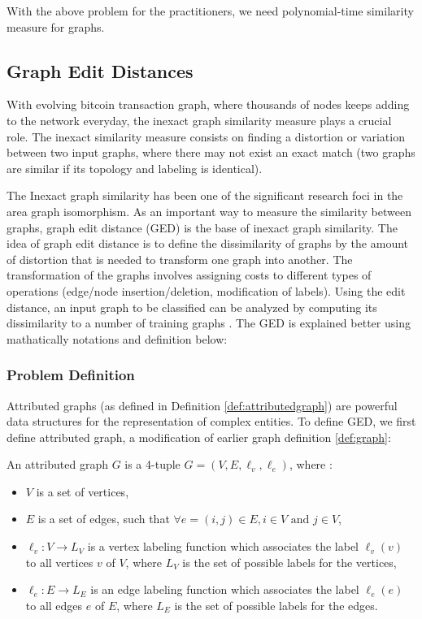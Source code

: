 With the above problem for the practitioners, we need polynomial-time similarity measure for graphs.
\subsection{Graph Edit Distances}

With evolving bitcoin transaction graph, where thousands of nodes keeps adding to the network everyday, the inexact graph similarity measure plays a crucial role. The inexact similarity measure consists on finding a distortion or variation between two input graphs, where there may not exist an exact match (two graphs are similar if its topology 
and labeling is identical).

The Inexact graph similarity has been one of the significant research foci in the area graph isomorphism. As an important way to measure the similarity between graphs, graph edit distance (GED) is the base of inexact graph similarity. The idea of graph edit distance is to define the dissimilarity of graphs by the amount of distortion that is needed to transform one graph into another. The transformation of the graphs involves assigning costs to different types of operations (edge/node insertion/deletion, modification of labels). Using the edit distance, an input graph to be classified can be analyzed by computing its dissimilarity to a number of training graphs \citep{Gao2010}. The GED is explained better using mathatically notations and definition below:

\subsubsection{Problem Definition}
Attributed graphs (as defined in Definition \ref{def:attributedgraph}) are powerful data structures for the representation of complex entities. To define GED, we first define attributed graph, a modification of earlier graph definition \ref{def:graph}: 

\begin{definition}

An attributed graph $G$ is a 4-tuple $G = (V,E,\ell_{v}, \ell_{e} )$, where :
\begin{itemize}
 \item $V$ is a set of vertices,
 \item $E$ is a set of edges, such that $\forall e=(i,j)  \in E, i \in V \textrm{ and } j \in V$,
 \item $\ell_{v} : V \rightarrow L_V$ is a vertex labeling function which associates the label $\ell_{v}(v)$ to all vertices $v$ of $V$,
  where $L_V$ is the set of possible labels for the vertices,
 \item $\ell_{e} : E \rightarrow L_E$ is an edge labeling function which associates the label $\ell_{e}(e)$ to all edges $e$ of $E$,
  where $L_E$ is the set of possible labels for the edges.
\end{itemize}
\label{def:attributedgraph}
\end{definition}

